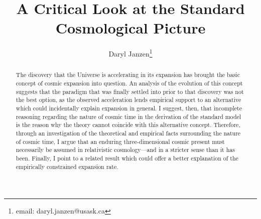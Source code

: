\documentclass[11pt]{article}
\title{A Critical Look at the Standard Cosmological Picture}%
\author{Daryl Janzen\footnote{\textrm{email: daryl.janzen@usask.ca}}}
\date{}
\begin{document}
\maketitle
\begin{abstract}
The discovery that the Universe is accelerating in its expansion has brought the basic concept of cosmic expansion into question. An analysis of the evolution of this concept suggests that the paradigm that was finally settled into prior to that discovery was not the best option, as the observed acceleration lends empirical support to an alternative which could incidentally explain expansion in general. I suggest, then, that incomplete reasoning regarding the nature of cosmic time in the derivation of the standard model is the reason why the theory cannot coincide with this alternative concept. Therefore, through an investigation of the theoretical and empirical facts surrounding the nature of cosmic time, I argue that an enduring three-dimensional cosmic present must necessarily be assumed in relativistic cosmology---and in a stricter sense than it has been. Finally, I point to a related result which could offer a better explanation of the empirically constrained expansion rate.
\end{abstract}
\end{document}
